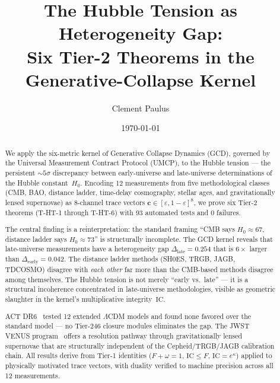 \documentclass[
  aps,
  prd,
  twocolumn,
  superscriptaddress,
  nofootinbib,
  floatfix
]{revtex4-2}
\newcommand{\eps}{\varepsilon}
\newcommand{\tvec}{\mathbf{c}}
\newcommand{\IC}{\mathrm{IC}}
\newcommand{\hetgap}{\Delta}
\newcommand{\Fid}{F}
\newcommand{\Drft}{\omega}
\newcommand{\Logint}{\kappa}
\begin{document}
\title{The Hubble Tension as Heterogeneity Gap:\\
Six Tier-2 Theorems in the Generative-Collapse Kernel}

\author{Clement Paulus}

\date{\today}

\begin{abstract}
We apply the six-metric kernel of Generative Collapse Dynamics
(GCD), governed by the Universal Measurement Contract Protocol
(UMCP), to the Hubble tension --- the persistent $\sim\!5\sigma$
discrepancy between early-universe and late-universe
determinations of the Hubble constant~$H_0$.
Encoding 12 measurements from five methodological classes
(CMB, BAO, distance ladder, time-delay cosmography, stellar
ages, and gravitationally lensed supernovae) as 8-channel
trace vectors $\tvec \in [\eps, 1{-}\eps]^{8}$, we prove
six Tier-2 theorems (T-HT-1 through T-HT-6) with 93 automated
tests and 0 failures.

The central finding is a reinterpretation: the standard framing
``CMB says $H_0 \approx 67$, distance ladder says $H_0 \approx 73$''
is structurally incomplete.
The GCD kernel reveals that late-universe measurements have a
heterogeneity gap $\hetgap_{\mathrm{late}} = 0.254$ that is
$6\times$ larger than $\hetgap_{\mathrm{early}} = 0.042$.
The distance ladder methods (SH0ES, TRGB, JAGB, TDCOSMO)
disagree with \emph{each other} far more than the CMB-based
methods disagree among themselves.
The Hubble tension is not merely ``early vs.\ late'' --- it is
a structural incoherence concentrated in late-universe methodologies,
visible as geometric slaughter in the kernel's multiplicative
integrity~$\IC$.

ACT DR6~\cite{louis2025act_dr6,calabrese2025act_ext} tested
12 extended $\Lambda$CDM models and found none favored over
the standard model --- no Tier-246 closure modules eliminates the gap.
The JWST VENUS program~\cite{venus2026} offers a resolution
pathway through gravitationally lensed supernovae that are
structurally independent of the Cepheid/TRGB/JAGB calibration
chain.
All results derive from Tier-1 identities
($\Fid + \Drft = 1$, $\IC \leq \Fid$, $\IC = e^{\Logint}$)
applied to physically motivated trace vectors, with duality
verified to machine precision across all 12 measurements.
\end{abstract}
\end{document}
